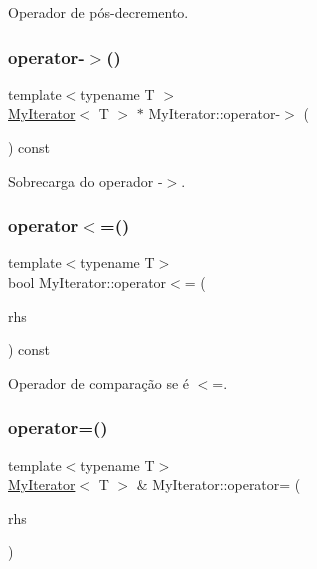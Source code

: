 Operador de pós-\/decremento. 

\mbox{\label{classsc_1_1MyIterator_a5d82243284e5b50a286e9b45b4566623}} 
\subsubsection{\texorpdfstring{operator-\/$>$()}{operator->()}}
{\footnotesize\ttfamily template$<$typename T $>$ \\
\hyperlink{classsc_1_1MyIterator}{My\+Iterator}$<$ T $>$ $\ast$ My\+Iterator\+::operator-\/$>$ (\begin{DoxyParamCaption}\item[{void}]{ }\end{DoxyParamCaption}) const}



Sobrecarga do operador -\/$>$. 

\mbox{\label{classsc_1_1MyIterator_ad8c2b40a518b2f112784f8fb2fe3e8fe}} 
\subsubsection{\texorpdfstring{operator$<$=()}{operator<=()}}
{\footnotesize\ttfamily template$<$typename T$>$ \\
bool My\+Iterator\+::operator$<$= (\begin{DoxyParamCaption}\item[{const \hyperlink{classsc_1_1MyIterator}{My\+Iterator}$<$ T $>$ \&}]{rhs }\end{DoxyParamCaption}) const}



Operador de comparação se é $<$=. 

\mbox{\label{classsc_1_1MyIterator_af36f2a583da36cbd26ea491a09810e42}} 
\subsubsection{\texorpdfstring{operator=()}{operator=()}}
{\footnotesize\ttfamily template$<$typename T$>$ \\
\hyperlink{classsc_1_1MyIterator}{My\+Iterator}$<$ T $>$ \& My\+Iterator\+::operator= (\begin{DoxyParamCaption}\item[{const \hyperlink{classsc_1_1MyIterator}{My\+Iterator}$<$ T $>$ \&}]{rhs }\end{DoxyParamCaption})}



